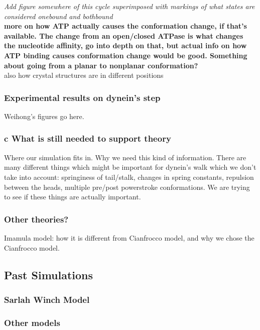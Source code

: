 \documentclass[10pt]{article} %
\begin{document}
\textit{Add figure somewhere of this cycle superimposed with markings of what states are considered onebound and bothbound}\\

\textbf{more on how ATP actually causes the conformation change, if that's available. The change from an open/closed ATPase is what changes the nucleotide affinity, go into depth on that, but actual info on how ATP binding causes conformation change would be good. Something about going from a planar to nonplanar conformation?}\\

also how crystal structures are in different positions

\subsubsection{Experimental results on dynein’s step}
Weihong's figures go here.\\

\subsubsection{c What is still needed to support theory}
Where our simulation fits in. Why we need this kind of information.
There are many different things which might be important for dynein's walk which we don't take into account: springiness of tail/stalk, changes in spring constants, repulsion between the heads, multiple pre/post powerstroke conformations. We are trying to see if these things are actually important.

\subsubsection{Other theories?}
Imamula model: how it is different from Cianfrocco model, and why we chose the Cianfrocco model.\\
	\subsection{Past Simulations}
		\subsubsection{Sarlah Winch Model}
		\subsubsection{Other models}
\end{document}
